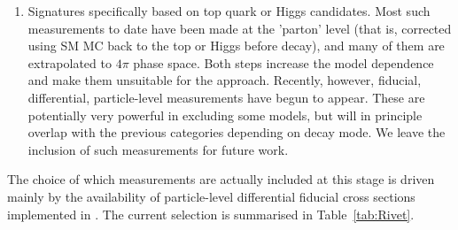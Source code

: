 \documentclass[floatfix]{article}
\begin{document}
\begin{enumerate}
\item
Signatures specifically based on top quark or Higgs candidates. Most such measurements to date have been made at the 'parton' level (that is,
corrected using SM MC back to the top or Higgs before decay), and many of them are extrapolated to $4\pi$ phase space. Both steps increase
the model dependence and make them unsuitable for the \Contur approach. Recently, however, fiducial, differential, particle-level measurements
have begun to appear\cite{Aad:2015hna,Khachatryan:2016gxp}. These are potentially very powerful in excluding some models, but will in principle 
overlap with the previous 
categories depending on decay mode. We leave the inclusion of such measurements for future work.
\end{enumerate}

The choice of which measurements are actually included at this stage is driven mainly by the availability of particle-level differential 
fiducial cross sections 
implemented in \rivet. The current selection is summarised in Table~\ref{tab:Rivet}.

\newcommand{\breaker}{}

\renewcommand{\arraystretch}{1.25}
\end{document}
